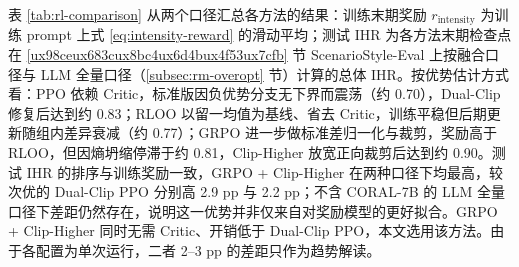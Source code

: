 \documentclass[fontset=fandol,type=master,campus=shenzhen,etitleauto=true]{hithesisbook}
\begin{document}
表 \ref{tab:rl-comparison} 从两个口径汇总各方法的结果：训练末期奖励 $r_{\text{intensity}}$ 为训练 prompt 上式 \eqref{eq:intensity-reward} 的滑动平均；测试 IHR 为各方法末期检查点在 \ref{ux98ceux683cux8bc4ux6d4bux4f53ux7cfb} 节 ScenarioStyle-Eval 上按融合口径与 LLM 全量口径（\ref{subsec:rm-overopt} 节）计算的总体 IHR。按优势估计方式看：PPO 依赖 Critic，标准版因负优势分支无下界而震荡（约 0.70），Dual-Clip 修复后达到约 0.83；RLOO 以留一均值为基线、省去 Critic，训练平稳但后期更新随组内差异衰减（约 0.77）；GRPO 进一步做标准差归一化与裁剪，奖励高于 RLOO，但因熵坍缩停滞于约 0.81，Clip-Higher 放宽正向裁剪后达到约 0.90。测试 IHR 的排序与训练奖励一致，GRPO + Clip-Higher 在两种口径下均最高，较次优的 Dual-Clip PPO 分别高 2.9 pp 与 2.2 pp；不含 CORAL-7B 的 LLM 全量口径下差距仍然存在，说明这一优势并非仅来自对奖励模型的更好拟合。GRPO + Clip-Higher 同时无需 Critic、开销低于 Dual-Clip PPO，本文选用该方法。由于各配置为单次运行，二者 2--3 pp 的差距只作为趋势解读。
\end{document}
